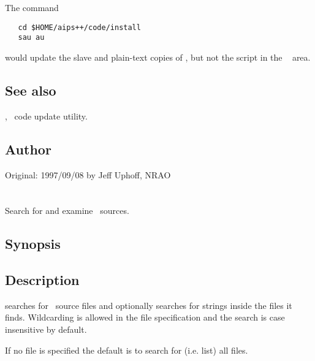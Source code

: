 The command

\begin{verbatim}
   cd $HOME/aips++/code/install
   sau au
\end{verbatim}

\noindent
would update the slave and plain-text copies of , but not the
script in the \aipspp\  area.

\subsection*{See also}

, \aipspp\ code update utility.

\subsection*{Author}

Original: 1997/09/08 by Jeff Uphoff, NRAO


\newpage
\section{}
\label{squiz}

Search for and examine \aipspp\ sources.

\subsection*{Synopsis}

\begin{synopsis}
\end{synopsis}

\subsection*{Description}

 searches for \aipspp\ source files and optionally searches for
strings inside the files it finds.  Wildcarding is allowed in the file
specification and the search is case insensitive by default.

If no file is specified the default is to search for (i.e. list) all files.

